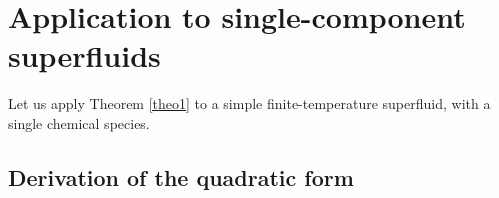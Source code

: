 \documentclass[a4paper, amsfonts, amssymb, amsmath, reprint, showkeys, nofootinbib, twoside,notitlepage,onecolumn]{revtex4-2}
\theoremstyle{definition}
\theoremstyle{theorem}
\theoremstyle{corollary}
\begin{document}



\vspace{-0.2cm}
\section{Application to single-component superfluids}\label{RelativisticSingleComponent}
\vspace{-0.2cm}

Let us apply Theorem \ref{theo1} to a simple finite-temperature superfluid, with a single chemical species.

\vspace{-0.3cm}
\subsection{Derivation of the quadratic form}
\vspace{-0.2cm}
\end{document}
